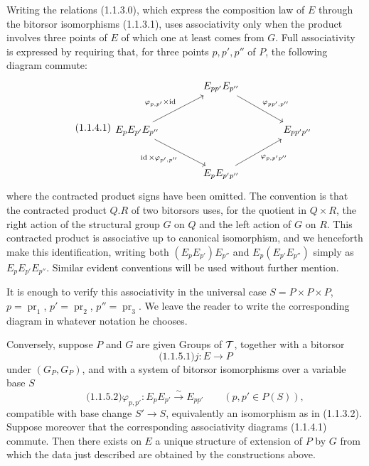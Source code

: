 \documentclass[11pt]{article}
\providecommand{\pr}{\operatorname{pr}}
\providecommand{\id}{\operatorname{id}}
\begin{document}
Writing the relations (1.1.3.0), which express the composition law of \(E\) through the bitorsor isomorphisms (1.1.3.1), uses associativity only when the product involves three points of \(E\) of which one at least comes from \(G\).  Full associativity is expressed by requiring that, for three points \(p,p',p''\) of \(P\), the following diagram commute:
\begin{equation}\qquad\text{(1.1.4.1)}
\begin{tikzcd}[column sep=large,row sep=large]
& E_{pp'}E_{p''}\arrow[dr,"\varphi_{pp',p''}"]&\\
E_pE_{p'}E_{p''}\arrow[ur,"\varphi_{p,p'}\times\id"]\arrow[dr,"\id\times\varphi_{p',p''}"']&&E_{pp'p''}\\
& E_pE_{p'p''}\arrow[ur,"\varphi_{p,p'p''}"']&
\end{tikzcd}
\end{equation}
where the contracted product signs have been omitted.  The convention is that the contracted product \(Q.R\) of two bitorsors uses, for the quotient in \(Q\times R\), the right action of the structural group \(G\) on \(Q\) and the left action of \(G\) on \(R\).  This contracted product is associative up to canonical isomorphism, and we henceforth make this identification, writing both \((E_pE_{p'})E_{p''}\) and \(E_p(E_{p'}E_{p''})\) simply as \(E_pE_{p'}E_{p''}\).  Similar evident conventions will be used without further mention.

It is enough to verify this associativity in the universal case \(S=P\times P\times P\), \(p=\pr_1\), \(p'=\pr_2\), \(p''=\pr_3\).  We leave the reader to write the corresponding diagram in whatever notation he chooses.

Conversely, suppose \(P\) and \(G\) are given Groups of \(\mathcal T\), together with a bitorsor
\begin{equation}\qquad\text{(1.1.5.1)}
  j:E\longrightarrow P
\end{equation}
under \((G_P,G_P)\), and with a system of bitorsor isomorphisms over a variable base \(S\)
\begin{equation}\qquad\text{(1.1.5.2)}
  \varphi_{p,p'}:E_pE_{p'}\xrightarrow{\sim}E_{pp'}
  \qquad (p,p'\in P(S)),
\end{equation}
compatible with base change \(S'\to S\), equivalently an isomorphism as in (1.1.3.2).  Suppose moreover that the corresponding associativity diagrams (1.1.4.1) commute.  Then there exists on \(E\) a unique structure of extension of \(P\) by \(G\) from which the data just described are obtained by the constructions above.
\end{document}
